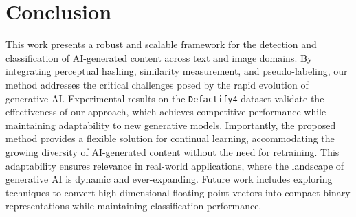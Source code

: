\section{Conclusion}
\label{sec:conclude}
This work presents a robust and scalable framework for the detection and classification of AI-generated content across text and image domains. By integrating perceptual hashing, similarity measurement, and pseudo-labeling, our method addresses the critical challenges posed by the rapid evolution of generative AI. Experimental results on the \texttt{Defactify4} dataset validate the effectiveness of our approach, which achieves competitive performance while maintaining adaptability to new generative models. Importantly, the proposed method provides a flexible solution for continual learning, accommodating the growing diversity of AI-generated content without the need for retraining. This adaptability ensures relevance in real-world applications, where the landscape of generative AI is dynamic and ever-expanding. Future work includes exploring techniques to convert high-dimensional floating-point vectors into compact binary representations while maintaining classification performance.
